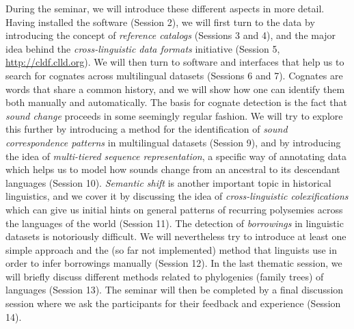 During the seminar, we will introduce these different aspects in more
detail. Having installed the software (Session 2), we will first turn to
the data by introducing the concept of \emph{reference catalogs}
(Sessions 3 and 4), and the major idea behind the \emph{cross-linguistic
data formats} initiative (Session 5, \url{http://cldf.clld.org}). We
will then turn to software and interfaces that help us to search for
cognates across multilingual datasets (Sessions 6 and 7). Cognates are
words that share a common history, and we will show how one can identify
them both manually and automatically. The basis for cognate detection is
the fact that \emph{sound change} proceeds in some seemingly regular
fashion. We will try to explore this further by introducing a method for
the identification of \emph{sound correspondence patterns} in
multilingual datasets (Session 9), and by introducing the idea of
\emph{multi-tiered sequence representation}, a specific way of
annotating data which helps us to model how sounds change from an
ancestral to its descendant languages (Session 10). \emph{Semantic
shift} is another important topic in historical linguistics, and we
cover it by discussing the idea of \emph{cross-linguistic
colexifications} which can give us initial hints on general patterns of
recurring polysemies across the languages of the world (Session 11). The
detection of \emph{borrowings} in linguistic datasets is notoriously
difficult. We will nevertheless try to introduce at least one simple
approach and the (so far not implemented) method that linguists use in
order to infer borrowings manually (Session 12). In the last thematic
session, we will briefly discuss different methods related to
phylogenies (family trees) of languages (Session 13). The seminar will
then be completed by a final discussion session where we ask the
participants for their feedback and experience (Session 14).
